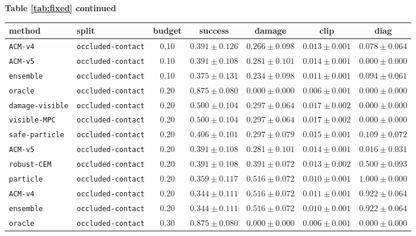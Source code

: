 \documentclass{article}
\begin{document}
\begin{center}
\textbf{Table \ref{tab:fixed} continued}\\[0.4ex]
\begin{tabular}{llccccc}
\toprule
method & split & budget & success & damage & clip & diag \\
\midrule
\texttt{ACM-v4} & \texttt{occluded-contact} & 0.10 & $0.391 \pm 0.126$ & $0.266 \pm 0.098$ & $0.013 \pm 0.001$ & $0.078 \pm 0.064$ \\
\texttt{ACM-v5} & \texttt{occluded-contact} & 0.10 & $0.391 \pm 0.108$ & $0.281 \pm 0.101$ & $0.014 \pm 0.001$ & $0.000 \pm 0.000$ \\
\texttt{ensemble} & \texttt{occluded-contact} & 0.10 & $0.375 \pm 0.131$ & $0.234 \pm 0.098$ & $0.011 \pm 0.001$ & $0.094 \pm 0.061$ \\
\texttt{oracle} & \texttt{occluded-contact} & 0.20 & $0.875 \pm 0.080$ & $0.000 \pm 0.000$ & $0.006 \pm 0.001$ & $0.000 \pm 0.000$ \\
\texttt{damage-visible} & \texttt{occluded-contact} & 0.20 & $0.500 \pm 0.104$ & $0.297 \pm 0.064$ & $0.017 \pm 0.002$ & $0.000 \pm 0.000$ \\
\texttt{visible-MPC} & \texttt{occluded-contact} & 0.20 & $0.500 \pm 0.104$ & $0.297 \pm 0.064$ & $0.017 \pm 0.002$ & $0.000 \pm 0.000$ \\
\texttt{safe-particle} & \texttt{occluded-contact} & 0.20 & $0.406 \pm 0.101$ & $0.297 \pm 0.079$ & $0.015 \pm 0.001$ & $0.109 \pm 0.072$ \\
\texttt{ACM-v5} & \texttt{occluded-contact} & 0.20 & $0.391 \pm 0.108$ & $0.281 \pm 0.101$ & $0.014 \pm 0.001$ & $0.016 \pm 0.031$ \\
\texttt{robust-CEM} & \texttt{occluded-contact} & 0.20 & $0.391 \pm 0.108$ & $0.391 \pm 0.072$ & $0.013 \pm 0.002$ & $0.500 \pm 0.093$ \\
\texttt{particle} & \texttt{occluded-contact} & 0.20 & $0.359 \pm 0.117$ & $0.516 \pm 0.072$ & $0.010 \pm 0.001$ & $1.000 \pm 0.000$ \\
\texttt{ACM-v4} & \texttt{occluded-contact} & 0.20 & $0.344 \pm 0.111$ & $0.516 \pm 0.072$ & $0.011 \pm 0.001$ & $0.922 \pm 0.064$ \\
\texttt{ensemble} & \texttt{occluded-contact} & 0.20 & $0.344 \pm 0.111$ & $0.516 \pm 0.072$ & $0.010 \pm 0.001$ & $0.922 \pm 0.064$ \\
\texttt{oracle} & \texttt{occluded-contact} & 0.30 & $0.875 \pm 0.080$ & $0.000 \pm 0.000$ & $0.006 \pm 0.001$ & $0.000 \pm 0.000$ \\

\end{tabular}
\end{center}
\end{document}

